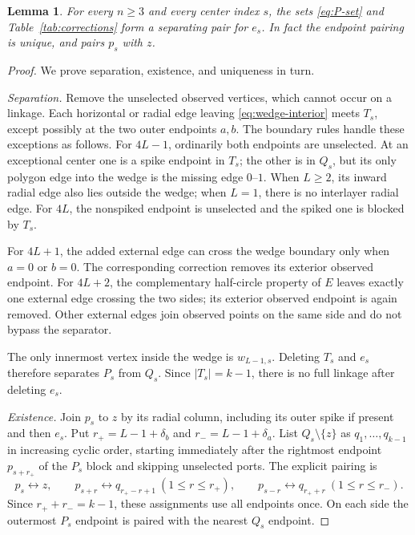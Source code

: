 \documentclass[11pt]{article}
\newtheorem{lemma}[theorem]{Lemma}
\theoremstyle{definition}
\begin{document}
\begin{lemma}
\label{lem:staircase}
For every $n\ge3$ and every center index $s$, the sets
\eqref{eq:P-set} and Table~\ref{tab:corrections} form a separating
pair for $e_s$. In fact the endpoint pairing is unique, and pairs
$p_s$ with $z$.
\end{lemma}
\begin{proof}
We prove separation, existence, and uniqueness in turn.

\emph{Separation.}
Remove the unselected observed vertices, which cannot occur on a
linkage. Each horizontal or radial edge leaving
\eqref{eq:wedge-interior} meets $T_s$, except possibly at the two
outer endpoints $a,b$. The boundary rules handle these exceptions
as follows. For $4L-1$, ordinarily both endpoints are unselected.
At an exceptional center one is a spike endpoint in $T_s$; the
other is in $Q_s$, but its only polygon edge into the wedge is
the missing edge $0$--$1$. When $L\ge2$, its inward radial
edge also lies outside the wedge; when $L=1$, there is no
interlayer radial edge.
For $4L$, the nonspiked endpoint is unselected and the spiked
one is blocked by $T_s$.

For $4L+1$, the added external edge can cross the wedge boundary
only when $a=0$ or $b=0$. The corresponding correction removes
its exterior observed endpoint. For $4L+2$, the complementary
half-circle property of $E$ leaves exactly one external edge
crossing the two sides; its exterior observed endpoint is again
removed. Other external edges join observed points on the same
side and do not bypass the separator.

The only innermost vertex inside the wedge is $w_{L-1,s}$.
Deleting $T_s$ and $e_s$ therefore separates $P_s$ from $Q_s$.
Since $|T_s|=k-1$, there is no full linkage after deleting $e_s$.

\emph{Existence.}
Join $p_s$ to $z$ by its radial column, including its outer spike
if present and then $e_s$. Put
$r_+=L-1+\delta_b$ and $r_-=L-1+\delta_a$.
List $Q_s\setminus\{z\}$ as $q_1,\ldots,q_{k-1}$ in increasing
cyclic order, starting immediately after the rightmost endpoint
$p_{s+r_+}$ of the $P_s$ block and skipping unselected ports.
The explicit pairing is
\begin{equation}
 p_s\longleftrightarrow z,\qquad
 p_{s+r}\longleftrightarrow q_{r_+-r+1}\ (1\le r\le r_+),
 \qquad
 p_{s-r}\longleftrightarrow q_{r_++r}\ (1\le r\le r_-).
 \label{eq:explicit-pairing}
\end{equation}
Since $r_++r_-=k-1$, these assignments use all endpoints once.
On each side the outermost $P_s$ endpoint is paired with the
nearest $Q_s$ endpoint.


\end{proof}
\end{document}

